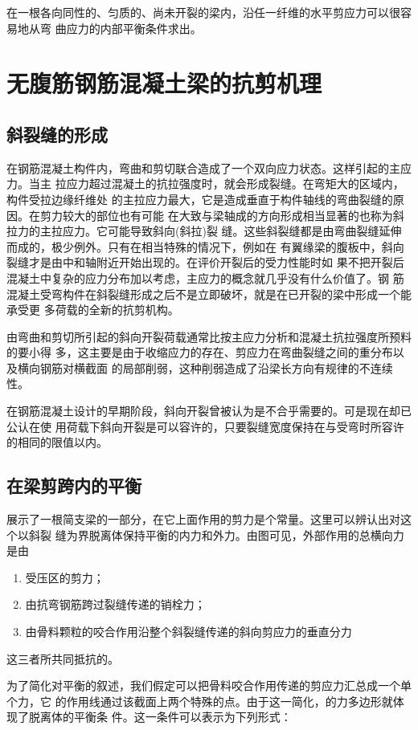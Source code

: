 \documentclass[12pt,a4paper]{book}
\begin{document}
在一根各向同性的、匀质的、尚未开裂的梁内，沿任一纤维的水平剪应力可以很容易地从弯
曲应力的内部平衡条件求出。

\section{无腹筋钢筋混凝土梁的抗剪机理}

\subsection{斜裂缝的形成}

在钢筋混凝土构件内，弯曲和剪切联合造成了一个双向应力状态。这样引起的主应力。当主
拉应力超过混凝土的抗拉强度时，就会形成裂缝。在弯矩大的区域内，构件受拉边缘纤维处
的主拉应力最大，它是造成垂直于构件轴线的弯曲裂缝的原因。在剪力较大的部位也有可能
在大致与梁轴成的方向形成相当显著的也称为斜拉力的主拉应力。它可能导致斜向(斜拉)裂
缝。这些斜裂缝都是由弯曲裂缝延伸而成的，极少例外。只有在相当特殊的情况下，例如在
有翼缘梁的腹板中，斜向裂缝才是由中和轴附近开始出现的。在评价开裂后的受力性能时如
果不把开裂后混凝土中复杂的应力分布加以考虑，主应力的概念就几乎没有什么价值了。钢
筋混凝土受弯构件在斜裂缝形成之后不是立即破坏，就是在已开裂的梁中形成一个能承受更
多荷载的全新的抗剪机构。

由弯曲和剪切所引起的斜向开裂荷载通常比按主应力分析和混凝土抗拉强度所预料的要小得
多，这主要是由于收缩应力的存在、剪应力在弯曲裂缝之间的重分布以及横向钢筋对横截面
的局部削弱，这种削弱造成了沿梁长方向有规律的不连续性。

在钢筋混凝土设计的早期阶段，斜向开裂曾被认为是不合乎需要的。可是现在却已公认在使
用荷载下斜向开裂是可以容许的，只要裂缝宽度保持在与受弯时所容许的相同的限值以内。

\subsection{在梁剪跨内的平衡}

展示了一根简支梁的一部分，在它上面作用的剪力是个常量。这里可以辨认出对这个以斜裂
缝为界脱离体保持平衡的内力和外力。由图可见，外部作用的总横向力是由
\begin{enumerate}
\item 受压区的剪力；
\item 由抗弯钢筋跨过裂缝传递的销栓力；
\item 由骨料颗粒的咬合作用沿整个斜裂缝传递的斜向剪应力的垂直分力
\end{enumerate}
这三者所共同抵抗的。

为了简化对平衡的叙述，我们假定可以把骨料咬合作用传递的剪应力汇总成一个单个力，它
的作用线通过该截面上两个特殊的点。由于这一简化，的力多边形就体现了脱离体的平衡条
件。这一条件可以表示为下列形式：
\end{document}

